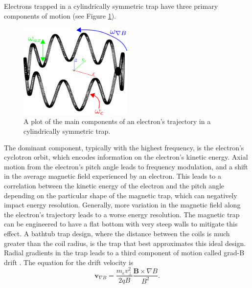 Electrons trapped in a cylindrically symmetric trap have three primary components of motion (see Figure \ref{fig:chap3-trapped-electron-motion}).
\begin{figure}[htbp]
    \centering
    \includegraphics[width=0.5\textwidth]{figs/Chapter-3/230511_trapped_motion.png}
    \caption{A plot of the main components of an electron's trajectory in a cylindrically symmetric trap.}
    \label{fig:chap3-trapped-electron-motion}
\end{figure}
The dominant component, typically with the highest frequency, is the electron's cyclotron orbit, which encodes information on the electron's kinetic energy. Axial motion from the electron's pitch angle leads to frequency modulation, and a shift in the average magnetic field experienced by an electron. This leads to a correlation between the kinetic energy of the electron and the pitch angle depending on the particular shape of the magnetic trap, which can negatively impact energy resolution. Generally, more variation in the magnetic field along the electron's trajectory leads to a worse energy resolution. The magnetic trap can be engineered to have a flat bottom with very steep walls to mitigate this effect. A bathtub trap design, where the distance between the coils is much greater than the coil radius, is the trap that best approximates this ideal design. Radial gradients in the trap leads to a third component of motion called grad-B drift \cite{jackson_classical_1999}. The equation for the drift velocity is
\begin{equation}
    \mathbf{v}_{\nabla B} = \frac{m_e v_\perp^2}{2qB}\frac{\mathbf{B}\times\nabla B}{B^2}.
\end{equation}

